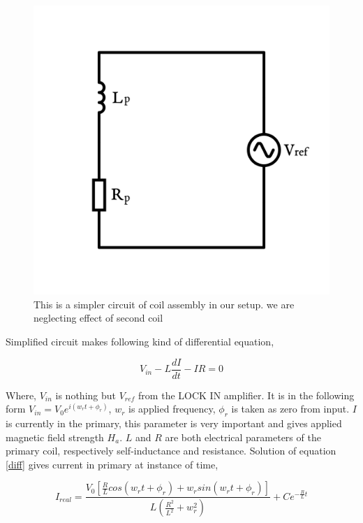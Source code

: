 \begin{figure}
  \includegraphics[width=1\linewidth]{circuit.png}
  \caption{This is a simpler circuit of coil assembly in our setup. we are neglecting effect of second coil}
  \label{fig:circuit}
\end{figure}

Simplified circuit makes following kind of differential equation,

\begin{equation}\label{diff}
  V_{in}-L\frac{dI}{dt}-IR=0
\end{equation}

Where, $V_{in}$ is nothing but $V_{ref}$ from the LOCK IN amplifier.  It is in the following form $V_{in} = V_0 e^{i(w_rt+\phi_r)}$, $w_r$ is applied frequency, $\phi_r$ is taken as zero from input. $I$ is currently in the primary, this parameter is very important and gives applied magnetic field strength $H_a$. $L$ and $R$ are both electrical parameters of the primary coil, respectively self-inductance and resistance. Solution of equation \ref{diff} gives current in primary at instance of time,

\begin{equation}
I_{real} = \frac{V_0\left[\frac{R}{L} cos(w_rt+\phi_r)+w_r sin(w_rt+\phi_r)\right]}{L(\frac{R^2}{L^2}+w_r^2)}+Ce^{-\frac{R}{L}t}  
\end{equation}

